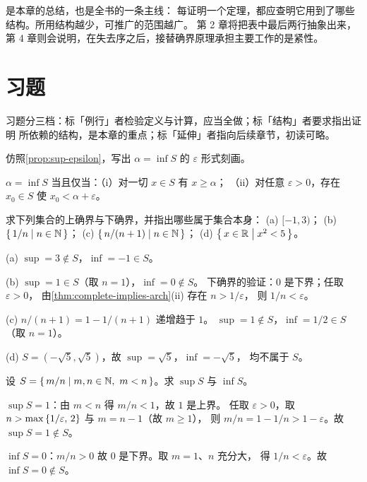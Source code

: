  是本章的总结，也是全书的一条主线：
每证明一个定理，都应查明它用到了哪些结构。所用结构越少，可推广的范围越广。
第 2 章将把表中最后两行抽象出来，
第 4 章则会说明，在失去序之后，接替确界原理承担主要工作的是紧性。

\section*{习题}

习题分三档：标「例行」者检验定义与计算，应当全做；标「结构」者要求指出证明
所依赖的结构，是本章的重点；标「延伸」者指向后续章节，初读可略。

\begin{exercise}[例行]
  \label{exr:inf-def}
  仿照\cref{prop:sup-epsilon}，写出 \(\alpha = \inf S\) 的 \(\varepsilon\) 形式刻画。
  \begin{solution}
    \(\alpha = \inf S\) 当且仅当：（i）对一切 \(x \in S\) 有 \(x \ge \alpha\)；
    （ii）对任意 \(\varepsilon > 0\)，存在 \(x_{0} \in S\) 使 \(x_{0} < \alpha + \varepsilon\)。
  \end{solution}
\end{exercise}

\begin{exercise}[例行]
  \label{exr:sup-compute-1}
  求下列集合的上确界与下确界，并指出哪些属于集合本身：
  (a) \([-1, 3)\)；\quad
  (b) \(\left\{\,1/n \;\middle|\; n \in \mathbb{N}\,\right\}\)；\quad
  (c) \(\left\{\,n/(n+1) \;\middle|\; n \in \mathbb{N}\,\right\}\)；\quad
  (d) \(\left\{\,x \in \mathbb{R} \;\middle|\; x^{2} < 5\,\right\}\)。
  \begin{solution}
    (a) \(\sup = 3 \notin S\)，\(\inf = -1 \in S\)。

    (b) \(\sup = 1 \in S\)（取 \(n=1\)），\(\inf = 0 \notin S\)。
    下确界的验证：\(0\) 是下界；任取 \(\varepsilon>0\)，
    由\cref{thm:complete-implies-arch}(ii) 存在 \(n > 1/\varepsilon\)，
    则 \(1/n < \varepsilon\)。

    (c) \(n/(n+1) = 1 - 1/(n+1)\) 递增趋于 \(1\)。
    \(\sup = 1 \notin S\)，\(\inf = 1/2 \in S\)（取 \(n=1\)）。

    (d) \(S = (-\sqrt{5}, \sqrt{5})\)，故 \(\sup = \sqrt{5}\)，\(\inf = -\sqrt{5}\)，
    均不属于 \(S\)。
  \end{solution}
\end{exercise}

\begin{exercise}[例行]
  \label{exr:sup-compute-2}
  设 \(S = \left\{\,m/n \;\middle|\; m, n \in \mathbb{N},\ m < n\,\right\}\)。求 \(\sup S\) 与 \(\inf S\)。
  \begin{solution}
    \(\sup S = 1\)：由 \(m < n\) 得 \(m/n < 1\)，故 \(1\) 是上界。
    任取 \(\varepsilon > 0\)，取 \(n > \max\left\{1/\varepsilon,\,2\right\}\) 与 \(m = n - 1\)（故 \(m \ge 1\)），
    则 \(m/n = 1 - 1/n > 1 - \varepsilon\)。故 \(\sup S = 1 \notin S\)。

    \(\inf S = 0\)：\(m/n > 0\) 故 \(0\) 是下界。取 \(m = 1\)、\(n\) 充分大，
    得 \(1/n < \varepsilon\)。故 \(\inf S = 0 \notin S\)。
  \end{solution}
\end{exercise}

